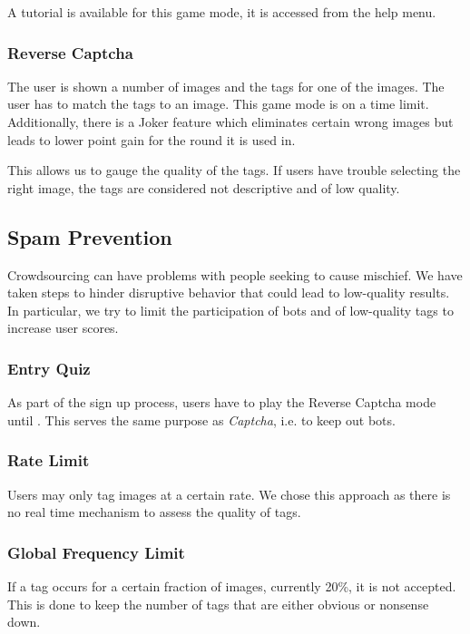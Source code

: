 A tutorial is available for this game mode, it is accessed from the help menu.

\subsubsection{Reverse Captcha}
\label{g14:sec:concepts:Gamemodes:reversecaptca}
The user is shown a number of images and the tags for one of the images. The user has to match the tags to an image.
This game mode is on a time limit. Additionally, there is a Joker feature which eliminates certain wrong images but leads to lower point gain for the round it is used in.

This allows us to gauge the quality of the tags. If users have trouble selecting the right image, the tags are considered not descriptive and of low quality.


\subsection{Spam Prevention}
\label{g14:sec:concepts:spamprevention}
Crowdsourcing can have problems with people seeking to cause mischief. We have taken steps to hinder disruptive behavior that could lead to low-quality results. In particular, we try to limit the participation of bots and  of low-quality tags to increase user scores.


\subsubsection{Entry Quiz}
\label{g14:sec:concepts:spamprevention:entryquiz}
As part of the sign up process, users have to play the Reverse Captcha mode until . This serves the same purpose as \textit{Captcha}, i.e. to keep out bots.


\subsubsection{Rate Limit}
\label{g14:sec:concepts:spamprevention:ratelimit}
Users may only tag images at a certain rate. We chose this approach as there is no real time mechanism to assess the quality of tags.


\subsubsection{Global Frequency Limit}
\label{g14:sec:concepts:spamprevention:frequencylimit}
If a tag occurs for a certain fraction of images, currently 20\%, it is not accepted. This is done to keep the number of tags that are either obvious or nonsense down.


